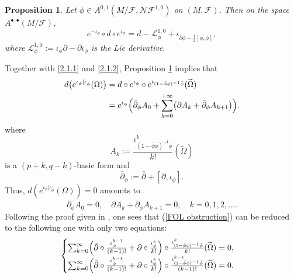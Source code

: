 \documentclass[12pt]{amsart}
\numberwithin{equation}{section}
\newtheorem{proposition}[theorem]{Proposition}
\theoremstyle{definition}
\theoremstyle{definition}
\theoremstyle{definition}
\renewcommand{\1}{\mathsf{1}}
\newcommand{\beq}{\begin{equation}}
\newcommand{\eeq}{\end{equation}}
\renewcommand{\>}{\rightarrow}
\newcommand{\sL}{{\mathcal L}}
\newcommand{\p}{\partial}
\newcommand{\bp}{\overline\partial}
\def\p{\partial}
\def\b{\bar}
\def\mc{\mathcal}
\theoremstyle{plain} %
\theoremstyle{plain} %
\theoremstyle{plain} %
\begin{document}
	\begin{proposition}\label{foliation main1}
		Let $\phi\in A^{0,1}(M/\mc F,\mc N\mc F^{1,0})$ on $(M,\mc F)$. Then on the space $A^{\bullet,\bullet}(M/\mc F)$,
		$$ e^{- \iota_{\phi}}\circ d\circ e^{ \iota_\phi}=d-\sL_\phi^{1,0}+\iota_{\bp\phi-\frac{1}{2}[\phi,\phi]},$$
		where $\sL_\phi^{1,0}:=\iota_\phi\p-\p \iota_\phi$ is the Lie derivative. \end{proposition}
	Together with
	\eqref{2.1.1} and \eqref{2.1.2}, Proposition \ref{foliation main1} implies that
\begin{align*}
	\begin{split}
		d\bigl(e^{\iota_{\phi} | \iota_{\bar{\phi}}}(\Omega)\bigr)
		&= d \circ e^{\iota_{\phi}} \circ e^{\iota_{(\mathbf{1} - \bar{\phi} \phi)^{-1} \bar{\phi}}}(\widetilde{\Omega}) \\
		&= e^{\iota_{\phi}} \Bigl( \bar{\partial}_{\phi} A_0 + \sum_{k=0}^{+\infty} \bigl( \partial A_k + \bar{\partial}_{\phi} A_{k+1} \bigr) \Bigr).
	\end{split}
\end{align*}
	where $$A_k:=\frac{{\iota}^k_{(\1-\b{ \phi} \phi)^{-1}\b{ \phi}}}{k!}(\widetilde{\Omega})$$  is a $(p+k,q-k)$-basic form and $$\b{\p}_{ \phi}:=\b{\p}+[\p, {\iota}_ \phi].$$
	Thus, $d(e^{ {\iota}_{ \phi}| {\iota}_{\b{ \phi}}}(\Omega))=0$ amounts to
	\beq\label{FOL obstruction}
	\b{\p}_{ \phi}A_0=0,\quad \p A_k+\b{\p}_{ \phi}A_{k+1}=0,\quad k=0,1,2,\ldots.
	\eeq
	Following  the proof given in \cite[Propositions 4.2, 4.5]{RWZ21}, one sees that (\ref{FOL obstruction})  can be reduced to the following one with only two equations:
	\begin{equation}\label{1.6}
		\begin{cases}
			\sum_{k=0}^{\infty}\Bigl(\b{\p}\circ\frac{ {\iota}^{k-1}_{ \phi}}{(k-1)!}+\p\circ\frac{ {\iota}^{k}_{ \phi}}{k!}\Bigr)\circ\frac{ {\iota}^{k}_{(\1-\b{ \phi} \phi)^{-1}\b{ \phi}}}{k!}(\widetilde{\Omega})=0,\\
			\sum_{k=0}^{\infty}\Bigl(\b{\p}\circ\frac{ {\iota}^{k-1}_{ \phi}}{(k-1)!}+\p\circ\frac{ {\iota}^{k}_{ \phi}}{k!}\Bigr)\circ\frac{ {\iota}^{k-1}_{(\1-\b{ \phi} \phi)^{-1}\b{ \phi}}}{(k-1)!}(\widetilde{\Omega})=0.
		\end{cases}
	\end{equation}
	
\end{document}
